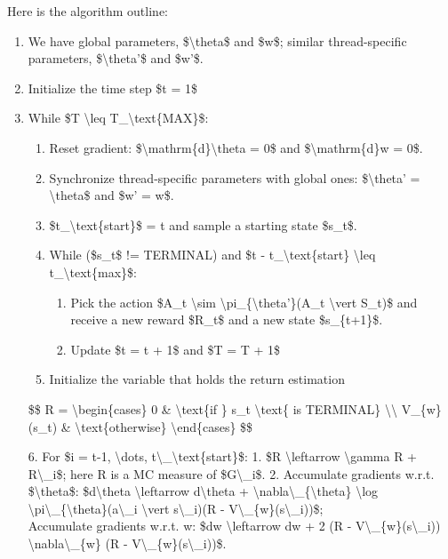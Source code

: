 Here is the algorithm outline:

\begin{enumerate}
\item
  We have global parameters, \$\textbackslash theta\$ and \$w\$; similar thread-specific parameters, \$\textbackslash theta'\$ and \$w'\$.
\item
  Initialize the time step \$t = 1\$
\item
  While \$T \textbackslash leq T\_\textbackslash text\{MAX\}\$:

  \begin{enumerate}
  \tightlist
  \item
    Reset gradient: \$\textbackslash mathrm\{d\}\textbackslash theta = 0\$ and \$\textbackslash mathrm\{d\}w = 0\$.
  \item
    Synchronize thread-specific parameters with global ones: \$\textbackslash theta' = \textbackslash theta\$ and \$w' = w\$.
  \item
    \$t\_\textbackslash text\{start\}\$ = t and sample a starting state \$s\_t\$.
  \item
    While (\$s\_t\$ != TERMINAL) and \$t - t\_\textbackslash text\{start\} \textbackslash leq t\_\textbackslash text\{max\}\$:

    \begin{enumerate}
    \tightlist
    \item
      Pick the action \$A\_t \textbackslash sim \textbackslash pi\_\{\textbackslash theta'\}(A\_t \textbackslash vert S\_t)\$ and receive a new reward \$R\_t\$ and a new state \$s\_\{t+1\}\$.
    \item
      Update \$t = t + 1\$ and \$T = T + 1\$
    \end{enumerate}
  \item
    Initialize the variable that holds the return estimation
  \end{enumerate}

  \$\$ R = \textbackslash begin\{cases\} 0 \& \textbackslash text\{if \} s\_t \textbackslash text\{ is TERMINAL\} \textbackslash\textbackslash{} V\_\{w\textquotesingle\}(s\_t) \& \textbackslash text\{otherwise\} \textbackslash end\{cases\} \$\$

  6. For \$i = t-1, \textbackslash dots, t\textbackslash\_\textbackslash text\{start\}\$: 1. \$R \textbackslash leftarrow \textbackslash gamma R + R\textbackslash\_i\$; here R is a MC measure of \$G\textbackslash\_i\$. 2. Accumulate gradients w.r.t. \$\textbackslash theta\textquotesingle\$: \$d\textbackslash theta \textbackslash leftarrow d\textbackslash theta + \textbackslash nabla\textbackslash\_\{\textbackslash theta\textquotesingle\} \textbackslash log \textbackslash pi\textbackslash\_\{\textbackslash theta\textquotesingle\}(a\textbackslash\_i \textbackslash vert s\textbackslash\_i)(R - V\textbackslash\_\{w\textquotesingle\}(s\textbackslash\_i))\$;\\
  Accumulate gradients w.r.t. w\textquotesingle: \$dw \textbackslash leftarrow dw + 2 (R - V\textbackslash\_\{w\textquotesingle\}(s\textbackslash\_i)) \textbackslash nabla\textbackslash\_\{w\textquotesingle\} (R - V\textbackslash\_\{w\textquotesingle\}(s\textbackslash\_i))\$.


\end{enumerate}
